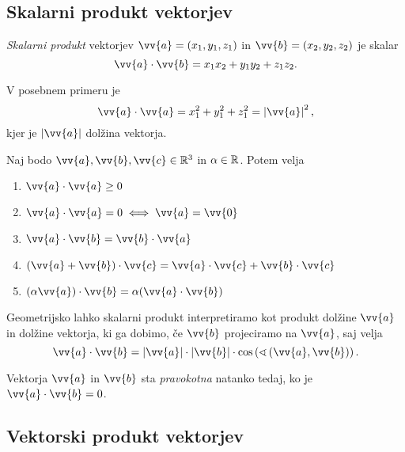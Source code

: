 \documentclass[12pt, a4paper]{article}
\begin{document}
\newpage

\subsection{Skalarni produkt vektorjev}

\begin{okvir}
\begin{definicija}
\emph{Skalarni produkt} vektorjev $\vv{a}=(x_1,y_1,z_1)$ in $\vv{b}=(x_2,y_2,z_2)$
je skalar
\[
\vv{a}\cdot\vv{b}=x_1x_2+y_1y_2+z_1z_2.
\]
\end{definicija}
\end{okvir}

\begin{opomba}
V posebnem primeru je
\[
\vv{a}\cdot\vv{a}=x_1^2+y_1^2+z_1^2=\left|\vv{a}\right|^2,
\]
kjer je $\left|\vv{a}\right|$ dolžina vektorja.
\end{opomba}

\begin{posledica}
Naj bodo $\vv{a},\vv{b},\vv{c}\in\R^3$ in $\alpha\in\mathbb{R}$. Potem velja

\begin{enumerate}[label=\roman*)]
\item $\vv{a}\cdot\vv{a}\geq 0$
\item $\vv{a}\cdot\vv{a}=0\iff\vv{a}=\vv{0}$
\item $\vv{a}\cdot\vv{b}=\vv{b}\cdot\vv{a}$
\item $(\vv{a}+\vv{b})\cdot\vv{c}=\vv{a}\cdot\vv{c}+\vv{b}\cdot\vv{c}$
\item $(\alpha\vv{a})\cdot\vv{b}=\alpha(\vv{a}\cdot\vv{b})$
\end{enumerate}
\end{posledica}

Geometrijsko lahko skalarni produkt interpretiramo kot produkt dolžine $\vv{a}$ in dolžine vektorja, ki ga dobimo, če $\vv{b}$ projeciramo na $\vv{a}$, saj velja
\[
\vv{a}\cdot\vv{b}=\left|\vv{a}\right|\cdot\left|\vv{b}\right|\cdot\cos\left(\sphericalangle\left(\vv{a},\vv{b}\right)\right).
\]

\begin{definicija}
Vektorja $\vv{a}$ in $\vv{b}$ sta \emph{pravokotna} natanko tedaj, ko je $\vv{a}\cdot\vv{b}=0$.
\end{definicija}

\newpage

\subsection{Vektorski produkt vektorjev}
\end{document}
